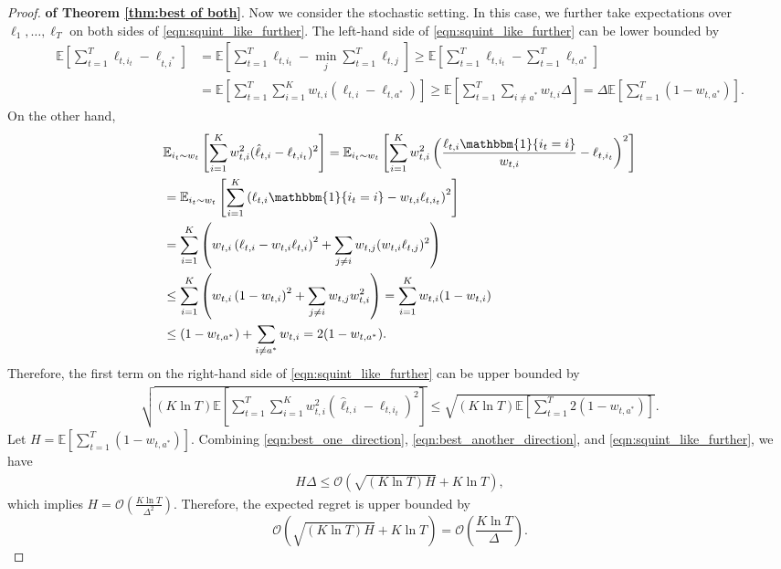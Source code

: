 \begin{proof}{\textbf{of Theorem \ref{thm:best of both}}.}
Now we consider the stochastic setting. In this case, we further take expectations over $\ell_1, \ldots, \ell_T$ on both sides of \eqref{eqn:squint_like_further}. The left-hand side of \eqref{eqn:squint_like_further} can be lower bounded by
\begin{align}
\mathbb{E}\left[\sum_{t=1}^T \ell_{t,i_t}-\ell_{t,i^*}\right]
&=\mathbb{E}\left[\sum_{t=1}^T \ell_{t,i_t}-\min_{j}\sum_{t=1}^T\ell_{t,j}\right]
\geq \mathbb{E}\left[\sum_{t=1}^T \ell_{t,i_t}-\sum_{t=1}^T\ell_{t,a^*}\right] \nonumber\\
&=\mathbb{E}\left[\sum_{t=1}^T \sum_{i=1}^K w_{t,i}(\ell_{t,i}-\ell_{t,a^*})\right]
\geq \mathbb{E}\left[\sum_{t=1}^T \sum_{i\neq a^*} w_{t,i}\Delta\right]=\Delta\mathbb{E}\left[ \sum_{t=1}^T (1-w_{t,a^*}) \right]. \label{eqn:best_one_direction}
\end{align}
On the other hand, 
\begin{align}
&\mathbb{E}_{i_t\sim w_t}\left[\sum_{i=1}^Kw_{t,i}^2(\hat{\ell}_{t,i}-\ell_{t,i_t})^2\right]
=\mathbb{E}_{i_t\sim w_t}\left[\sum_{i=1}^Kw_{t,i}^2\left(\frac{\ell_{t,i}\mathbbm{1}\{i_t=i\}}{w_{t,i}}-\ell_{t,i_t}\right)^2\right] \nonumber \\
&=\mathbb{E}_{i_t\sim w_t}\left[\sum_{i=1}^K\left(\ell_{t,i}\mathbbm{1}\{i_t=i\}-w_{t,i}\ell_{t,i_t}\right)^2\right] \nonumber \\
&=\sum_{i=1}^K \left( w_{t,i}\left( \ell_{t,i}-w_{t,i}\ell_{t,i} \right)^2 +\sum_{j\neq i} w_{t,j}(w_{t,i}\ell_{t,j})^2 \right) \nonumber \\
&\leq \sum_{i=1}^K \left( w_{t,i}\left( 1-w_{t,i}\right)^2 +\sum_{j\neq i} w_{t,j}w_{t,i}^2 \right)=\sum_{i=1}^K w_{t,i}(1-w_{t,i}) \nonumber \\
&\leq (1-w_{t,a^*}) + \sum_{i\neq a^*} w_{t,i} = 2(1-w_{t,a^*}). \label{eqn:regret_expansion_best_both}
\end{align}
Therefore, the first term on the right-hand side of \eqref{eqn:squint_like_further} can be upper bounded by
\begin{align}
\sqrt{(K\ln T)\mathbb{E}\left[\sum_{t=1}^T \sum_{i=1}^K w_{t,i}^2(\hat{\ell}_{t,i}-\ell_{t,i_t})^2\right]}\leq \sqrt{(K\ln T) \mathbb{E}\left[\sum_{t=1}^T 2(1-w_{t,a^*}) \right]}. \label{eqn:best_another_direction}
\end{align}
Let $H=\mathbb{E}\left[\sum_{t=1}^T (1-w_{t,a^*}) \right]$. Combining \eqref{eqn:best_one_direction}, \eqref{eqn:best_another_direction}, and \eqref{eqn:squint_like_further}, we have 
\begin{align*}
H\Delta \leq \mathcal{O}\left(\sqrt{(K\ln T)H} + K\ln T\right), 
\end{align*}
which implies $H=\mathcal{O}\left(\frac{K\ln T}{\Delta^2}\right)$. Therefore, the expected regret is upper bounded by 
\[\mathcal{O}\left( \sqrt{(K\ln T)H}+K\ln T \right) = \mathcal{O}\left(\frac{K\ln T}{\Delta}\right) .\]


\end{proof}
